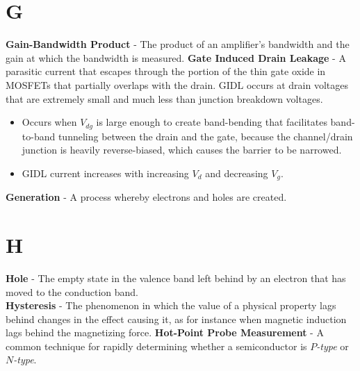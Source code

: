 \section{G}
    \textbf{Gain-Bandwidth Product} - The product of an amplifier's bandwidth and the gain at which the bandwidth is measured.
    \vspace{0.15cm}
    \textbf{Gate Induced Drain Leakage} - A parasitic current that escapes through the portion of the thin gate oxide in MOSFETs that partially overlaps with the drain. GIDL occurs at drain voltages that are extremely small and much less than junction breakdown voltages.
    \vspace{0.15cm}
    \begin{itemize}
        \setlength\itemsep{0.5em}
        \item{Occurs when $V_{dg}$ is large enough to create band-bending that facilitates band-to-band tunneling between the drain and the gate, because the channel/drain junction is heavily reverse-biased, which causes the barrier to be narrowed.}
        \item{GIDL current increases with increasing $V_d$ and decreasing $V_g$.}
    \end{itemize}
\vspace{0.5cm}
    \textbf{Generation} - A process whereby electrons and holes are created.
\section{H}
    \textbf{Hole} - The empty state in the valence band left behind by an electron that has moved to the conduction band.\\
    \vspace{0.15cm}
    \textbf{Hysteresis} - The phenomenon in which the value of a physical property lags behind changes in the effect causing it, as for instance when magnetic induction lags behind the magnetizing force.
\vspace{0.5cm}
\noindent
    \textbf{Hot-Point Probe Measurement} - A common technique for rapidly determining whether a semiconductor is $P$\emph{-type} or $N$\emph{-type}.
